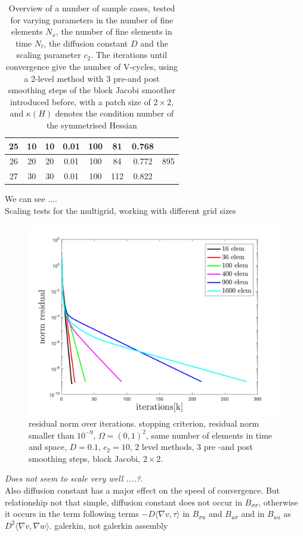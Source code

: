\documentclass[../draft_1.tex]{subfiles}
\begin{document}
\begin{table}[]
\begin{tabular}{||c|c|c|c|c|c|c|c||}
		\toprule
		25 & 10 & 10 & 0.01 & 100 & 81 & 0.768 &  \\ \hline
		26 & 20 & 20 & 0.01 & 100 & 84 & 0.772 & 895 \\ \hline
		27 & 30 & 30 & 0.01 & 100 & 112 & 0.822 &  \\ 
		\bottomrule
	\end{tabular}
\caption{Overview of a number of sample cases, tested for varying parameters in the number of fine elements $N_x$, the number of fine elements in time $N_t$, the diffusion constant $D$ and the scaling parameter $c_2$. The iterations until convergence give the number of V-cycles, using a 2-level method with 3 pre-and post smoothing steps of the block Jacobi smoother introduced before, with a patch size of $2 \times 2$, and $\kappa(H)$ denotes the condition number of the symmetrised Hessian}
\end{table}

We can see .... 
\bigskip\\
Scaling tests for the multigrid, working with different grid sizes

\begin{figure}[h!]
	\centering
	\includegraphics[scale=0.4]{images/implementation/multigrid_scaling/scaling_residual_mg}
	\caption{residual norm over iterations. stopping criterion, residual norm smaller than $10^{-9}$, $\Omega = (0,1)^2$, same number of elements in time and space, $D = 0.1$, $c_2 = 10$, 2 level methods, 3 pre -and post smoothing steps, block Jacobi, $2 \times 2$.}
\end{figure}

\textit{Does not seem to scale very well ....?}.
\\
Also diffusion constant has a major effect on the speed of convergence. But relationship not that simple, diffusion constant does not occur in $B_{\sigma \sigma}$, otherwise it occurs in the term following terms $- D \langle \nabla v, \tau \rangle$ in $B_{\sigma u}$ and $B_{u \sigma}$ and in $B_{u u} $ as $ D^2 \langle \nabla v, \nabla w \rangle$.
  galerkin, not galerkin assembly \\
  
\end{document}
